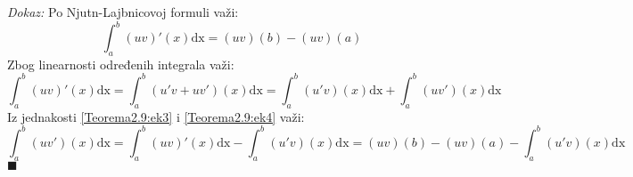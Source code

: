 \documentclass{article}
\begin{document}
\textit{Dokaz:} Po Njutn-Lajbnicovoj formuli važi:
\begin{equation}
    \displaystyle\int^b_a (uv)'(x)\text{dx} = (uv)(b) - (uv)(a)
    \label{Teorema2.9:ek3}
\end{equation}
Zbog linearnosti određenih integrala važi:
\begin{equation}
    \displaystyle\int^b_a (uv)'(x)\text{dx} = \int^b_a(u'v + uv')(x)\text{dx} = \int^b_a(u'v)(x)\text{dx} + \int^b_a(uv')(x)\text{dx}
    \label{Teorema2.9:ek4}
\end{equation}
Iz jednakosti \eqref{Teorema2.9:ek3} i \eqref{Teorema2.9:ek4} važi:
$$\int^b_a(uv')(x)\text{dx}=\displaystyle\int^b_a (uv)'(x)\text{dx} - \int^b_a(u'v)(x)\text{dx}= (uv)(b) - (uv)(a) - \int^b_a(u'v)(x)\text{dx}$$
\null\hfill $\blacksquare$\par
\end{document}
